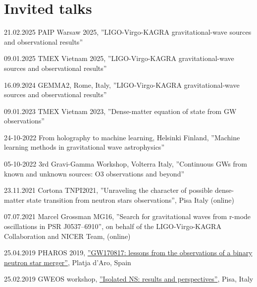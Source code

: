 \documentclass[]{friggeri-cv} %
\begin{document}
%  
\section{Invited talks}
\begin{entrylistoc}

\entrys
{21.02.2025}
{PAIP Warsaw 2025, ''LIGO-Virgo-KAGRA gravitational-wave sources and observational results''} 

\entrys
{09.01.2025}
{TMEX Vietnam 2025, ''LIGO-Virgo-KAGRA gravitational-wave sources and observational results''} 

\entrys
{16.09.2024}
{GEMMA2, Rome, Italy, ''LIGO-Virgo-KAGRA gravitational-wave sources and observational results''} 

\entrys
{09.01.2023}
{TMEX Vietnam 2023, ''Dense-matter equation of state from GW observations''} 

\entrys
{24-10-2022}
{From holography to machine learning, Helsinki Finland, ''Machine learning methods in gravitational wave astrophysics''}

\entrys
{05-10-2022}
{3rd Gravi-Gamma Workshop, Volterra Italy, ''Continuous GWs from known and unknown sources: O3 observations and beyond''}

\entrys 
{23.11.2021}
{Cortona TNPI2021, ''Unraveling the character of possible dense-matter state transition from neutron stars observations'', Pisa Italy (online)}

\entrys
{07.07.2021}{
Marcel Grossman MG16, ''Search for gravitational waves from r-mode oscillations in PSR J0537--6910'', on behalf of the LIGO-Virgo-KAGRA Collaboration and NICER Team, (online)}


\entrys 
{25.04.2019} 
{{PHAROS 2019}, \href{https://indico.ice.csic.es/event/12/page/12-final-program}{''GW170817: lessons from the observations of a binary neutron star merger''}, {Platja d'Aro, Spain}}  

\entrys 
{25.02.2019} 
{{GWEOS workshop}, \href{https://agenda.infn.it/event/17643/timetable/\#20190225}{''Isolated NS: results and perspectives''}, {Pisa, Italy}} 




\end{entrylistoc}
\end{document}
